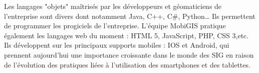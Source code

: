 Les langages "objets" maîtrisés par les développeurs et géomaticiens de l'entreprise sont divers dont notamment Java, C++, C\#, Python… Ils permettent de programmer les progiciels de l'entreprise. L'équipe MobiGIS pratique également les langages web du moment : HTML 5, JavaScript, PHP, CSS 3,etc. Ils développent sur les principaux supports mobiles : IOS et Android, qui prennent aujourd'hui une importance croissante dans le monde des SIG en raison de l'évolution des pratiques liées à l'utilisation des smartphones et des tablettes. \\